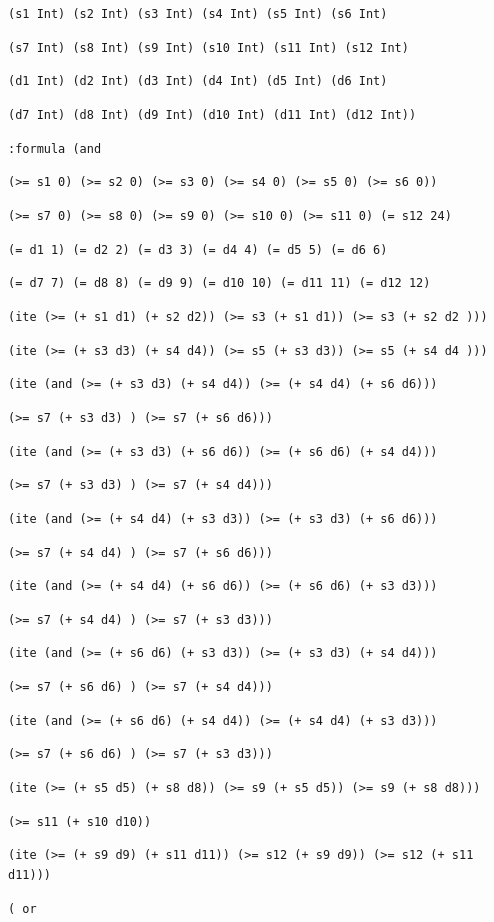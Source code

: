 \documentclass[11pt]{article}
\begin{document}
{{{\tt (s1 Int) (s2 Int) (s3 Int) (s4 Int) (s5 Int) (s6 Int)}

{\tt (s7 Int) (s8 Int) (s9 Int) (s10 Int) (s11 Int) (s12 Int)}

{\tt (d1 Int) (d2 Int) (d3 Int) (d4 Int) (d5 Int) (d6 Int)}

{\tt (d7 Int) (d8 Int) (d9 Int) (d10 Int) (d11 Int) (d12 Int))}

{\tt :formula (and}

{\tt (>= s1 0) (>= s2 0) (>= s3 0) (>= s4 0) (>= s5 0) (>= s6 0))}

{\tt (>= s7 0) (>= s8 0) (>= s9 0) (>= s10 0) (>= s11 0) (= s12 24)}

{\tt (= d1 1) (= d2 2) (= d3 3) (= d4 4) (= d5 5) (= d6 6)}

{\tt (= d7 7) (= d8 8) (= d9 9) (= d10 10) (= d11 11) (= d12 12)}

{\tt (ite (>= (+ s1 d1) (+ s2 d2))  (>= s3 (+ s1 d1))  (>= s3 (+ s2 d2 )))}

{\tt (ite (>= (+ s3 d3) (+ s4 d4))  (>= s5 (+ s3 d3))  (>= s5 (+ s4 d4 )))}

{\tt (ite (and (>= (+ s3 d3) (+ s4 d4)) (>= (+ s4 d4) (+ s6 d6))) }

{\tt (>= s7 (+ s3 d3) ) (>= s7 (+ s6 d6)))}

{\tt (ite (and (>= (+ s3 d3) (+ s6 d6)) (>= (+ s6 d6) (+ s4 d4)))}

{\tt (>= s7 (+ s3 d3) ) (>= s7 (+ s4 d4)))}

{\tt (ite (and (>= (+ s4 d4) (+ s3 d3)) (>= (+ s3 d3) (+ s6 d6))) }

{\tt (>= s7 (+ s4 d4) ) (>= s7 (+ s6 d6)))}

{\tt (ite (and (>= (+ s4 d4) (+ s6 d6)) (>= (+ s6 d6) (+ s3 d3))) }

{\tt (>= s7 (+ s4 d4) ) (>= s7 (+ s3 d3)))}

{\tt (ite (and (>= (+ s6 d6) (+ s3 d3)) (>= (+ s3 d3) (+ s4 d4))) }

{\tt (>= s7 (+ s6 d6) ) (>= s7 (+ s4 d4)))}

{\tt (ite (and (>= (+ s6 d6) (+ s4 d4)) (>= (+ s4 d4) (+ s3 d3))) }

{\tt (>= s7 (+ s6 d6) ) (>= s7 (+ s3 d3)))}

{\tt (ite (>= (+ s5 d5) (+ s8 d8)) (>= s9 (+ s5 d5)) (>= s9 (+ s8 d8)))}

{\tt (>= s11 (+ s10 d10))}

{\tt (ite (>= (+ s9 d9) (+ s11 d11)) (>= s12 (+ s9 d9)) (>= s12 (+ s11 d11)))}

{\tt ( or}

}}
\end{document}
